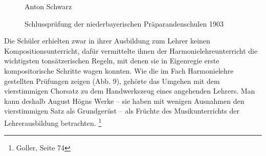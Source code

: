 \begin{figure}
\caption{Anton Schwarz}
\end{figure}

\begin{figure}
\caption{Schlussprüfung der niederbayerischen Präparandenschulen 1903}
\end{figure}

Die Schüler erhielten zwar in ihrer Ausbildung zum Lehrer keinen
Kompositionsunterricht, dafür vermittelte ihnen der
Harmonielehreunterricht die wichtigsten tonsätzerischen Regeln, mit
denen sie in Eigenregie erste kompositorische Schritte wagen konnten.
Wie die im Fach Harmonielehre gestellten Prüfungen zeigen (Abb. 9),
gehörte das Umgehen mit dem vierstimmigen Chorsatz zu dem Handwerkszeug
eines angehenden Lehrers. Man kann deshalb August Högns Werke – sie
haben mit wenigen Ausnahmen den vierstimmigen Satz als Grundgerüst –
als Früchte des Musikunterrichts der Lehrerausbildung
betrachten. \footnote{Goller, Seite 74}
